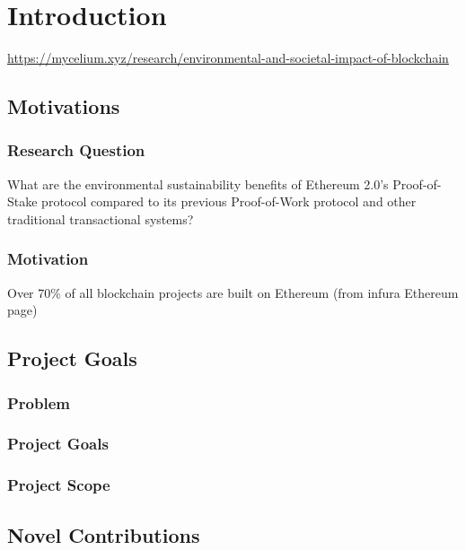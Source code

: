 \chapter{Introduction}
\url{https://mycelium.xyz/research/environmental-and-societal-impact-of-blockchain}
\section{Motivations}

\subsection{Research Question}

What are the environmental sustainability benefits of Ethereum 2.0's Proof-of-Stake protocol compared to its previous Proof-of-Work protocol and other traditional transactional systems?

\subsection{Motivation}

Over 70\% of all blockchain projects are built on Ethereum (from infura Ethereum page)


\section{Project Goals}
\subsection{Problem}
\subsection{Project Goals}
\subsection{Project Scope}

\section{Novel Contributions}